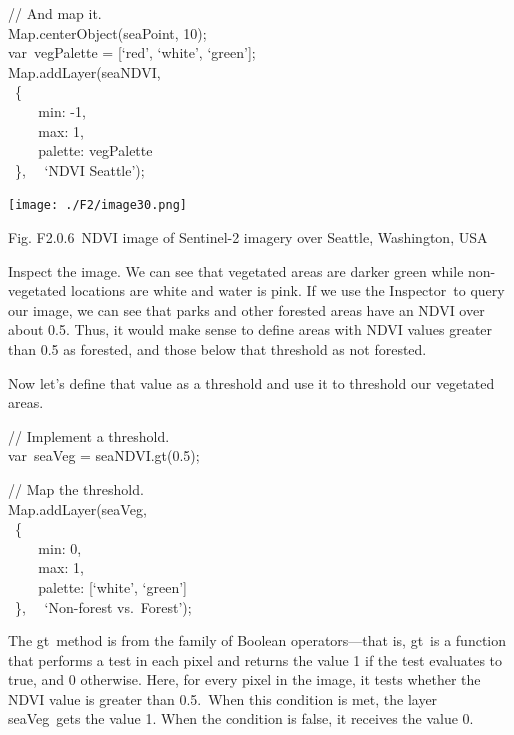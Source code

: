 \documentclass[
  letterpaper,
  DIV=11,
  numbers=noendperiod]{scrreprt}
\begin{document}
// And map it.\\
Map.centerObject(seaPoint, 10);\\
var~vegPalette = {[}`red', `white', `green'{]};\\
Map.addLayer(seaNDVI,\\
\hspace*{0.333em} ~\{\\
\hspace*{0.333em} ~ ~ ~min: -1,\\
\hspace*{0.333em} ~ ~ ~max: 1,\\
\hspace*{0.333em} ~ ~ ~palette: vegPalette\\
\hspace*{0.333em} ~\},~ ~`NDVI Seattle');

\texttt{[image: ./F2/image30.png]}

Fig. F2.0.6~NDVI image of Sentinel-2 imagery over Seattle, Washington,
USA

Inspect the image. We can see that vegetated areas are darker green
while non-vegetated locations are white and water is pink. If we use the
Inspector~to query our image, we can see that parks and other forested
areas have an NDVI over about 0.5. Thus, it would make sense to define
areas with NDVI values greater than 0.5 as forested, and those below
that threshold as not forested.

Now let's define that value as a threshold and use it to threshold our
vegetated areas.

// Implement a threshold.\\
var~seaVeg = seaNDVI.gt(0.5);

// Map the threshold.\\
Map.addLayer(seaVeg,\\
\hspace*{0.333em} ~\{\\
\hspace*{0.333em} ~ ~ ~min: 0,\\
\hspace*{0.333em} ~ ~ ~max: 1,\\
\hspace*{0.333em} ~ ~ ~palette: {[}`white', `green'{]}\\
\hspace*{0.333em} ~\},~ ~`Non-forest vs.~Forest');

The gt~method is from the family of Boolean operators---that is, gt~is a
function that performs a test in each pixel and returns the value 1 if
the test evaluates to true, and 0 otherwise. Here, for every pixel in
the image, it tests whether the NDVI value is greater than 0.5.~When
this condition is met, the layer seaVeg~gets the value 1. When the
condition is false, it receives the value 0.
\end{document}
